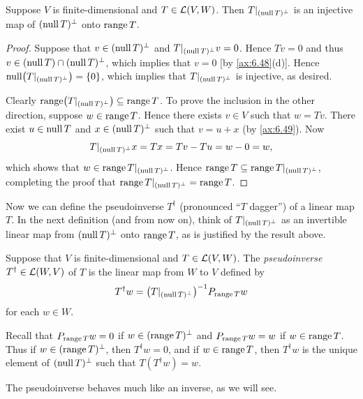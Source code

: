 \begin{result}\label{ax:6.67}
Suppose $V$ is finite-dimensional and $T\in\mathcal{L}(V,W)$. Then
$T|_{(\operatorname{null} T)^\perp}$ is an injective map of $(\operatorname{null} T)^\perp$ onto $\operatorname{range} T$.
\end{result}

\begin{proof}
Suppose that $v\in(\operatorname{null} T)^\perp$ and $T|_{(\operatorname{null} T)^\perp}v=0$. Hence $Tv=0$
and thus $v\in(\operatorname{null} T)\cap(\operatorname{null} T)^\perp$, which implies that $v=0$ [by
\ref{ax:6.48}(d)]. Hence $\operatorname{null}\bigl(T|_{(\operatorname{null} T)^\perp}\bigr)=\{0\}$, which
implies that $T|_{(\operatorname{null} T)^\perp}$ is injective, as desired.

Clearly $\operatorname{range}\bigl(T|_{(\operatorname{null} T)^\perp}\bigr)\subseteq\operatorname{range} T$. To prove the
inclusion in the other direction, suppose $w\in\operatorname{range} T$. Hence there exists
$v\in V$ such that $w=Tv$. There exist $u\in\operatorname{null} T$ and $x\in(\operatorname{null} T)^\perp$
such that $v=u+x$ (by \ref{ax:6.49}). Now
\[ T|_{(\operatorname{null} T)^\perp}x = Tx = Tv-Tu = w-0 = w, \]
which shows that $w\in\operatorname{range} T|_{(\operatorname{null} T)^\perp}$. Hence
$\operatorname{range} T\subseteq\operatorname{range} T|_{(\operatorname{null} T)^\perp}$, completing the proof that
$\operatorname{range} T|_{(\operatorname{null} T)^\perp}=\operatorname{range} T$.
\end{proof}

%
Now we can define the pseudoinverse $T^\dagger$ (pronounced ``$T$ dagger'') of
a linear map $T$. In the next definition (and from now on), think of
$T|_{(\operatorname{null} T)^\perp}$ as an invertible linear map from $(\operatorname{null} T)^\perp$ onto
$\operatorname{range} T$, as is justified by the result above.

\begin{definition}\label{ax:6.68}
Suppose that $V$ is finite-dimensional and $T\in\mathcal{L}(V,W)$. The
\emph{pseudoinverse} $T^\dagger\in\mathcal{L}(W,V)$ of $T$ is the linear map from $W$
to $V$ defined by
\[ T^\dagger w = \bigl(T|_{(\operatorname{null} T)^\perp}\bigr)^{-1}P_{\operatorname{range} T}w \]
for each $w\in W$.
\end{definition}

Recall that $P_{\operatorname{range} T}w=0$ if $w\in(\operatorname{range} T)^\perp$ and
$P_{\operatorname{range} T}w=w$ if $w\in\operatorname{range} T$. Thus if $w\in(\operatorname{range} T)^\perp$, then
$T^\dagger w=0$, and if $w\in\operatorname{range} T$, then $T^\dagger w$ is the unique
element of $(\operatorname{null} T)^\perp$ such that $T(T^\dagger w)=w$.

The pseudoinverse behaves much like an inverse, as we will see.

